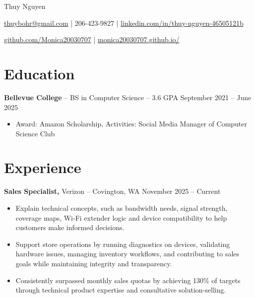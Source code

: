 \documentclass[11pt]{article}       %
\begin{document}
\centerline{\Huge Thuy Nguyen}

\vspace{5pt}

\centerline{\href{mailto:thuybohr@gmail.com}{thuybohr@gmail.com} | 206-423-9827 |
\href{https://www.linkedin.com/in/thuy-nguyen-46505121b/}{linkedin.com/in/thuy-nguyen-46505121b}}

\centerline{\href{https://github.com/Monica20030707}{github.com/Monica20030707} | 
\href{https://monica20030707.github.io/}{monica20030707.github.io/}} 

\vspace{-9pt}

\section*{Education}
\textbf{Bellevue College} -- BS in Computer Science -- 3.6 GPA \hfill September 2021 -- June 2025\\
\vspace{-9pt}
\begin{itemize}
  \item Award: Amazon Scholarship, Activities: Social Media Manager of Computer Science Club
\end{itemize}

\vspace{-18.5pt}

\section*{Experience}

\textbf{Sales Specialist,} {Verizon} -- Covington, WA \hfill November 2025 -- Current \\
\vspace{-9pt}
\begin{itemize}
  \item Explain technical concepts, such as bandwidth needs, signal strength, coverage maps, Wi-Fi extender logic and device compatibility to help customers make informed decisions.
  \item Support store operations by running diagnostics on devices, validating hardware issues, managing inventory workflows, and contributing to sales goals while maintaining integrity and transparency.
  \item Consistently surpassed monthly sales quotas by achieving 130\% of targets through technical product expertise and consultative solution-selling.
\end{itemize}
\end{document}
